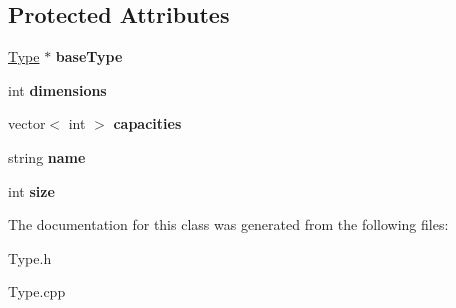 \subsection*{Protected Attributes}
\begin{DoxyCompactItemize}
\item 
\hypertarget{classArrayType_ad96f5a08809064f0cc8ce7566618d02d}{\hyperlink{classType}{Type} $\ast$ {\bfseries base\-Type}}\label{classArrayType_ad96f5a08809064f0cc8ce7566618d02d}

\item 
\hypertarget{classArrayType_a892992ea07fd2f97b0733de0048bf8a4}{int {\bfseries dimensions}}\label{classArrayType_a892992ea07fd2f97b0733de0048bf8a4}

\item 
\hypertarget{classArrayType_a19ffe6f7281d7b2e6fc24063e145c465}{vector$<$ int $>$ {\bfseries capacities}}\label{classArrayType_a19ffe6f7281d7b2e6fc24063e145c465}

\item 
\hypertarget{classType_ad7eeefba3dfcecbdaa98d46aaa84e389}{string {\bfseries name}}\label{classType_ad7eeefba3dfcecbdaa98d46aaa84e389}

\item 
\hypertarget{classType_a871302dc63ac1a37c0b6a225cf82048d}{int {\bfseries size}}\label{classType_a871302dc63ac1a37c0b6a225cf82048d}

\end{DoxyCompactItemize}


The documentation for this class was generated from the following files\-:\begin{DoxyCompactItemize}
\item 
Type.\-h\item 
Type.\-cpp\end{DoxyCompactItemize}
